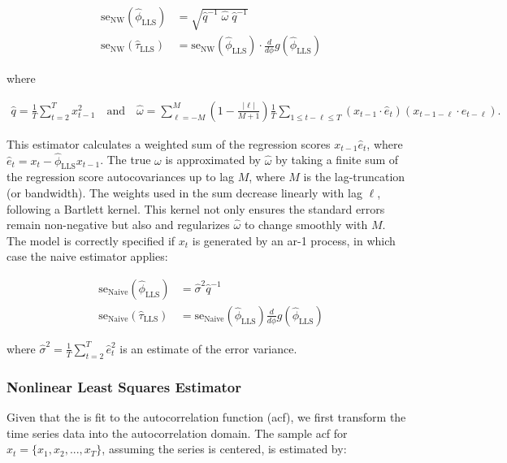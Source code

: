 \documentclass[main.tex]{subfiles}
\begin{document}
\begin{align}
\text{se}_{\text{NW}}(\hat\phi_{\text{LLS}}) &= \sqrt{\hat q^{-1}\;\hat\omega\; \hat q^{-1}}\\
\text{se}_{\text{NW}}(\hat\tau_{\text{LLS}}) &= \text{se}_{\text{NW}}(\hat\phi_{\text{LLS}}) \cdot \frac{d}{d\phi} g(\hat\phi_{\text{LLS}})
\end{align}

where

\begin{align*}
    \hat q = \frac{1}{T} \sum_{t=2}^T x_{t-1}^2 \quad\text{and}\quad
    \hat \omega = \sum_{\ell=-M}^M (1 - \frac{|\ell|}{M+1}) \frac{1}{T} \sum_{1\le t - \ell \le T} (x_{t-1} \cdot \hat e_t)(x_{t-1-\ell} \cdot \hat e_{t-\ell}).
\end{align*}

This estimator calculates a weighted sum of the regression scores $x_{t-1} \hat e_t$, where $\hat e_t = x_t - \hat\phi_{\text{LLS}} x_{t-1}$. The true $\omega$ is approximated by $\hat \omega$ by taking a finite sum of the regression score autocovariances up to lag $M$, where $M$ is the lag-truncation (or bandwidth). The weights used in the sum decrease linearly with lag $\ell$, following a Bartlett kernel. This kernel not only ensures the standard errors remain non-negative but also and regularizes $\hat \omega$ to change smoothly with $M$.\\


The model is correctly specified if $x_t$ is generated by an ar-1 process, in which case the naive estimator applies:

\begin{align} 
    \text{se}_\text{Naive}(\hat\phi_{\text{LLS}}) &= \hat\sigma^2 \hat q^{-1}\\
    \text{se}_\text{Naive}(\hat\tau_{\text{LLS}}) &= \text{se}_{\text{Naive}}(\hat\phi_{\text{LLS}}) \frac{d}{d\phi} g(\hat\phi_{\text{LLS}})
\end{align}

where $\hat\sigma^2 = \frac{1}{T} \sum_{t=2}^T \hat e_t^2$ is an estimate of the error variance.

\subsubsection{Nonlinear Least Squares Estimator}

Given that the  is fit to the autocorrelation function (acf), we first transform the time series data into the autocorrelation domain. The sample acf for $x_t = \{x_1, x_2, ..., x_T\}$, assuming the series is centered, is estimated by:
\end{document}
